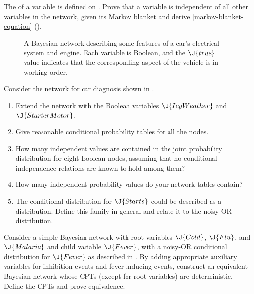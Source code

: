 \begin{exercise}
The  of a variable is defined on
. Prove that a variable is independent of all other variables in
the network, given its Markov blanket and derive \eqref{markov-blanket-equation} ().
\end{exercise} 



\begin{figure}[htp]
\caption{A Bayesian network describing some features of a car's electrical
system and engine. Each variable is Boolean, and the \(\J{true}\) value indicates
that the corresponding aspect of the vehicle is in working order.}
\label{car-starts-figure}
\end{figure} 

\begin{exercise}
Consider the network for car diagnosis shown in . 
\begin{enumerate}
\item Extend the network with the Boolean variables \(\J{IcyWeather}\) and
\(\J{StarterMotor}\).
\item Give reasonable conditional probability tables for all the nodes.
\item How many independent values are contained in the joint
probability distribution for eight Boolean nodes, assuming that  no conditional
independence relations are known to hold among them?
\item How many independent probability values do your network tables contain?
\item The conditional distribution for \(\J{Starts}\) could be described
as a  distribution. Define this family in general and relate it to 
the noisy-OR distribution.
\end{enumerate}
\end{exercise} 

\begin{iexercise}
Consider a simple Bayesian network with root variables \(\J{Cold}\),
\(\J{Flu}\), and \(\J{Malaria}\) and child variable \(\J{Fever}\),
with a noisy-OR conditional distribution for \(\J{Fever}\) as
described in . By adding
appropriate auxiliary variables for inhibition events and
fever-inducing events, construct an equivalent Bayesian network whose
CPTs (except for root variables) are deterministic. Define the CPTs
and prove equivalence.
\end{iexercise} 

